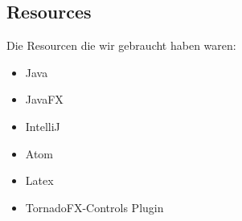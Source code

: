 \subsection{Resources}
Die Resourcen die wir gebraucht haben waren:
\begin{itemize}
  \item Java
  \item JavaFX
  \item IntelliJ
  \item Atom
  \item Latex
  \item TornadoFX-Controls Plugin


\end{itemize}
